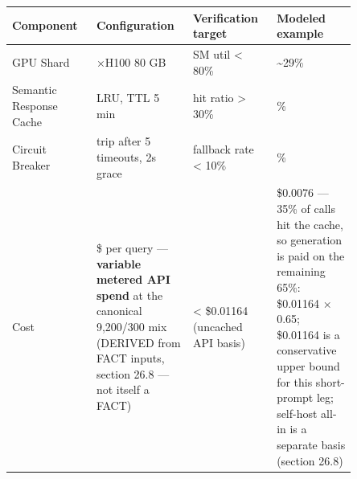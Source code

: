 \nopagebreak[4]
\begin{longtable}[]{@{}
  >{\raggedright\arraybackslash}p{0.2127\linewidth}
  >{\raggedright\arraybackslash}p{0.2127\linewidth}
  >{\raggedright\arraybackslash}p{0.2127\linewidth}
  >{\raggedright\arraybackslash}p{0.2127\linewidth}@{}}
\toprule\noalign{}
\begin{minipage}[b]{\linewidth}\raggedright
Component
\end{minipage} & \begin{minipage}[b]{\linewidth}\raggedright
Configuration
\end{minipage} & \begin{minipage}[b]{\linewidth}\raggedright
Verification target
\end{minipage} & \begin{minipage}[b]{\linewidth}\raggedright
Modeled example
\end{minipage} \\
\midrule\noalign{}
\endhead
\bottomrule\noalign{}
\endlastfoot
GPU Shard & 8×H100 80 GB & SM util \textless{} 80\% &
\textasciitilde29\% \\
\noalign{\label{tab:26.2}}
Semantic Response Cache & LRU, TTL 5 min & hit ratio \textgreater{} 30\%
& 35\% \\
Circuit Breaker & trip after 5 timeouts, 2s grace & fallback rate
\textless{} 10\% & 7\% \\
Cost & \$ per query --- \textbf{variable metered API spend} at the
canonical 9,200/300 mix (DERIVED from FACT inputs, section 26.8 --- not
itself a FACT) & \textless{} \$0.01164 (uncached API basis) & \$0.0076
--- 35\% of calls hit the cache, so generation is paid on the remaining
65\%: \$0.01164 × 0.65; \$0.01164 is a conservative upper bound for this
short-prompt leg; self-host all-in is a separate basis (section 26.8) \\
\end{longtable}

